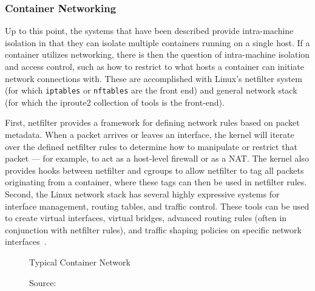 \documentclass[12pt,titlepage]{article}
\begin{document}
\subsubsection{Container Networking}
Up to this point, the systems that have been described provide intra-machine isolation in that they can isolate multiple containers running on a single host.
If a container utilizes networking, there is then the question of intra-machine isolation and access control, such as how to restrict to what hosts a container can initiate network connections with.
These are accomplished with Linux's netfilter system (for which \texttt{iptables} or \texttt{nftables} are the front end) and general network stack (for which the iproute2 collection of tools is the front-end).

First, netfilter provides a framework for defining network rules based on packet metadata.
When a packet arrives or leaves an interface, the kernel will iterate over the defined netfilter rules to determine how to manipulate or restrict that packet --- for example, to act as a host-level firewall or as a NAT\@.
The kernel also provides hooks between netfilter and cgroups to allow netfilter to tag all packets originating from a container, where these tags can then be used in netfilter rules.
Second, the Linux network stack has several highly expressive systems for interface management, routing tables, and traffic control.
These tools can be used to create virtual interfaces, virtual bridges, advanced routing rules (often in conjunction with netfilter rules), and traffic shaping policies on specific network interfaces~\cite{iproute2wiki,netfilterhome}.

\begin{figure}
   \centering
   \caption{Typical Container Network}
   \caption*{Source:~\cite{dockercontainernetwork}}
\end{figure}
\end{document}
